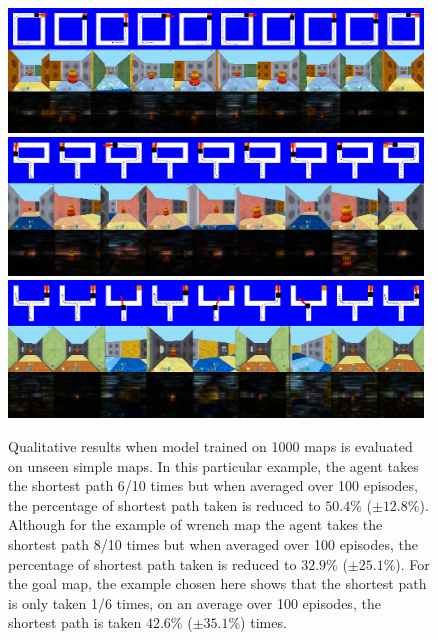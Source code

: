 \begin{figure}[h]
\def\vertspace{1em}
%
\includegraphics[width=0.98\textwidth]{./exp-results/training-1000_on_square_map.png}%
\vspace{\vertspace}
%
\includegraphics[width=0.98\textwidth]{./exp-results/training-1000_on_wrench_map.png}%
\vspace{\vertspace}
%
\includegraphics[width=0.98\textwidth]{./exp-results/training-1000_on_goal_map.png}%
\caption{Qualitative results when model trained on 1000 maps is
  evaluated on unseen simple maps.
  In this particular example, the agent takes the shortest path 6/10 times but when averaged over 100 episodes, the percentage of shortest path taken is reduced to $50.4$\% ($\pm 12.8$\%).
  Although for the example of wrench map the agent takes the shortest path 8/10 times but when averaged over 100 episodes, the percentage of shortest path taken is reduced to $32.9$\% ($\pm 25.1$\%).
 For the goal map, the example chosen here shows that the shortest path is only taken 1/6 times, on an average over 100 episodes, the shortest path is taken $42.6$\% ($\pm 35.1$\%) times.
}
\label{fig:planning-qualitative}
\end{figure}

